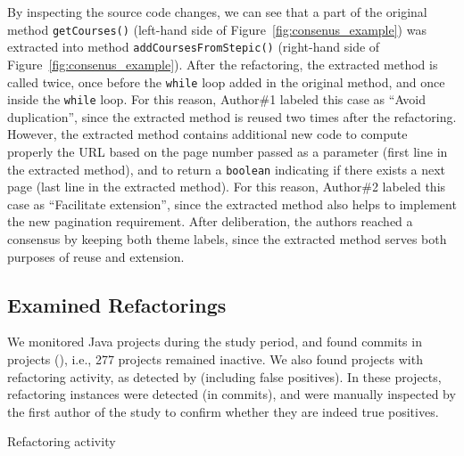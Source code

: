 By inspecting the source code changes, we can see that a part of the original method \texttt{getCourses()} (left-hand side of Figure~\ref{fig:consenus_example})
was extracted into method \texttt{addCoursesFromStepic()} (right-hand side of Figure~\ref{fig:consenus_example}).
After the refactoring, the extracted method is called twice, once before the \texttt{while} loop added in the original method, and once inside the \texttt{while} loop.
For this reason, Author\#1 labeled this case as ``Avoid duplication'', since the extracted method is reused two times after the refactoring.
However, the extracted method contains additional new code to compute properly the URL based on the page number passed as a parameter (first line in the extracted method),
and to return a \texttt{boolean} indicating if there exists a next page (last line in the extracted method).
For this reason, Author\#2 labeled this case as ``Facilitate extension'', since the extracted method also helps to implement the new pagination requirement.
After deliberation, the authors reached a consensus by keeping both theme labels, since the extracted method serves both purposes of reuse and extension.






\subsection{Examined Refactorings}

We monitored \totalProjects Java projects during the study period, and found commits in \activeProjects projects (\activeProjectsPercentage), i.e., 277 projects remained inactive.
We also found  projects with refactoring activity, as detected by \toolName (including false positives).
In these projects, \detectedRefactorings refactoring instances were detected (in \commitsWithDetectedRefactoring commits), and were manually inspected by the first author of the study to confirm whether they are indeed true positives.
 
\begin{table}[ht]
\centering
\renewcommand{\arraystretch}{1.2}
\caption{Refactoring activity}
\label{TabRefactoringActivity}

\end{table}

